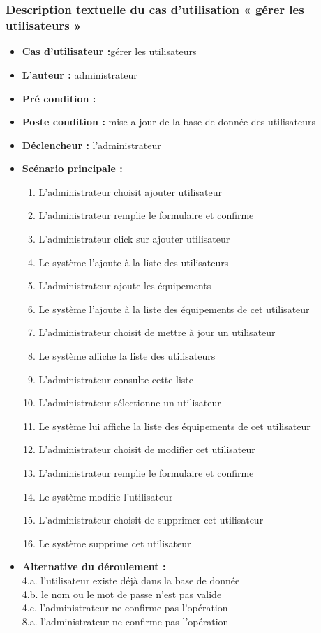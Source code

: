 \paragraph{\\}
\newpage 
\subsubsection{ Description textuelle du cas d'utilisation « gérer les utilisateurs »}
\begin{itemize}
\item \textbf{Cas d'utilisateur :}gérer les utilisateurs
\item \textbf{L'auteur : }administrateur
\item \textbf{Pré condition :}
\item \textbf{Poste condition :} mise a jour de la base de donnée des utilisateurs
\item \textbf{Déclencheur :} l'administrateur 
\item \textbf{Scénario principale :}
\begin{enumerate}
\item L'administrateur choisit ajouter utilisateur
\item L'administrateur remplie le formulaire et confirme
\item L'administrateur click sur ajouter utilisateur 
\item Le système l'ajoute à la liste des utilisateurs
\item L'administrateur ajoute les équipements
\item Le système l'ajoute à la liste des équipements de cet utilisateur
\item L'administrateur choisit de mettre à jour un utilisateur  
\item Le système affiche la liste des utilisateurs
\item L'administrateur consulte cette liste
\item L'administrateur sélectionne un utilisateur 
\item Le système lui affiche la liste des équipements de cet utilisateur 
\item L'administrateur choisit de modifier cet utilisateur
\item L'administrateur remplie le formulaire et confirme
\item Le système modifie l'utilisateur
\item L'administrateur choisit de supprimer cet utilisateur
\item Le système supprime cet utilisateur 
\end{enumerate}
\item \textbf{Alternative du déroulement :\\}
4.a. l'utilisateur existe déjà dans la base de donnée \\
4.b. le nom ou le mot de passe n'est pas valide\\
4.c. l'administrateur ne confirme pas l'opération\\
8.a. l'administrateur ne confirme pas l'opération\\
\end{itemize}

